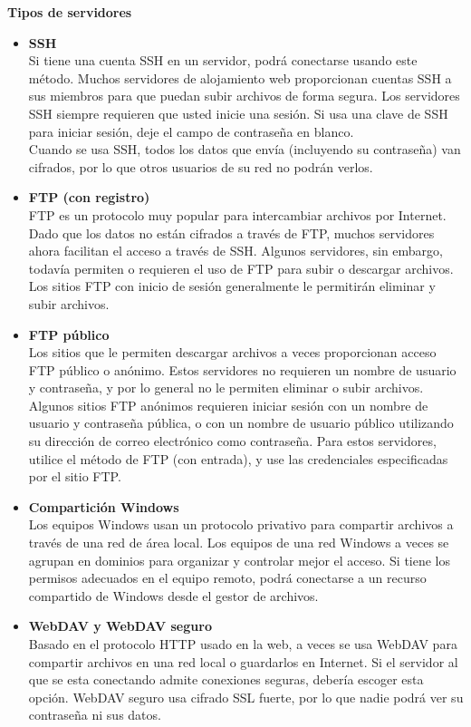 {\bf Tipos de servidores}
\begin{itemize}
\item {\bf SSH}\\
Si tiene una cuenta SSH en un servidor, podrá conectarse usando este método. Muchos servidores de alojamiento web proporcionan cuentas SSH a sus miembros para que puedan subir archivos de forma segura. Los servidores SSH siempre requieren que usted inicie una sesión. Si usa una clave de SSH para iniciar sesión, deje el campo de contraseña en blanco.\\
Cuando se usa SSH, todos los datos que envía (incluyendo su contraseña) van cifrados, por lo que otros usuarios de su red no podrán verlos.
\item {\bf FTP (con registro)}\\
FTP es un protocolo muy popular para intercambiar archivos por Internet. Dado que los datos no están cifrados a través de FTP, muchos servidores ahora facilitan el acceso a través de SSH. Algunos servidores, sin embargo, todavía permiten o requieren el uso de FTP para subir o descargar archivos. Los sitios FTP con inicio de sesión generalmente le permitirán eliminar y subir archivos.
\item {\bf FTP público}\\
Los sitios que le permiten descargar archivos a veces proporcionan acceso FTP público o anónimo. Estos servidores no requieren un nombre de usuario y contraseña, y por lo general no le permiten eliminar o subir archivos.\\
Algunos sitios FTP anónimos requieren iniciar sesión con un nombre de usuario y contraseña pública, o con un nombre de usuario público utilizando su dirección de correo electrónico como contraseña. Para estos servidores, utilice el método de FTP (con entrada), y use las credenciales especificadas por el sitio FTP.
\item {\bf Compartición Windows}\\
Los equipos Windows usan un protocolo privativo para compartir archivos a través de una red de área local. Los equipos de una red Windows a veces se agrupan en dominios para organizar y controlar mejor el acceso. Si tiene los permisos adecuados en el equipo remoto, podrá conectarse a un recurso compartido de Windows desde el gestor de archivos.
\item {\bf WebDAV y WebDAV seguro}\\
Basado en el protocolo HTTP usado en la web, a veces se usa WebDAV para compartir archivos en una red local o guardarlos en Internet. Si el servidor al que se esta conectando admite conexiones seguras, debería escoger esta opción. WebDAV seguro usa cifrado SSL fuerte, por lo que nadie podrá ver su contraseña ni sus datos.
\end{itemize}
